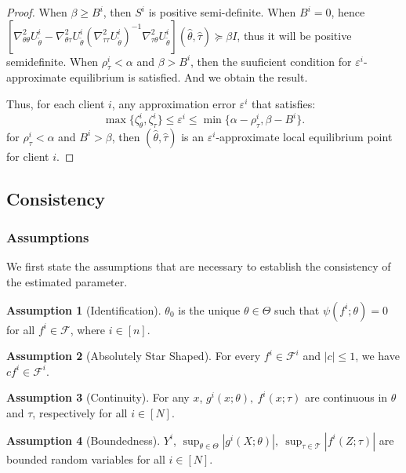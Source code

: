 \documentclass{article}
\def\gF{{\mathcal{F}}}
\def\gT{{\mathcal{T}}}
\theoremstyle{definition}
\newtheorem{assumption}{Assumption}%
\begin{document}
\begin{proof}
When $\beta\geq B^i$, then  $S^i$ is positive semi-definite. 
When $B^i=0$, hence $\left[\nabla_{\theta\theta}^2U_{\tilde\theta}^i-\nabla_{\theta\tau}^2U_{\tilde\theta}^i\left(\nabla_{\tau\tau}^2U_{\tilde\theta}^i\right)^{-1}\nabla_{\tau\theta}^2U_{\tilde\theta}^i\right](\hat\theta,\hat\tau)\succeq \beta I$, thus it will be positive semidefinite. When $\rho_{\tau}^i<\alpha $ and $\beta>B^i$, then the suuficient condition for $\varepsilon^i$-approximate equilibrium is satisfied. And we obtain the result.


Thus, for each client $i$, any approximation error $\varepsilon^i$ that satisfies:
\begin{equation*}
 \max\{ \zeta_{\theta}^i, \zeta_{\tau}^i\}\le \varepsilon^i\le \min\{\alpha-\rho_{\tau}^i,\beta- B^i \}.  
\end{equation*}
for $\rho_{\tau}^i<\alpha$ and $B^i>\beta$, then $(\hat\theta,\hat\tau)$ is an $\varepsilon^i$-approximate local equilibrium point for client $i$.
\end{proof}

\subsection{Consistency}
\label{ap:consistency}
\subsubsection{Assumptions}
We first state the assumptions that are necessary to establish the consistency of the estimated parameter.

\begin{assumption}[Identification]
\label{asm:identification_consistency}
    $\theta_0$ is the unique $\theta\in\Theta$ such that $\psi(f^i;\theta)=0$ for all $f^i\in \gF$, where $i\in[n]$.
\end{assumption}

\begin{assumption}[Absolutely Star Shaped]
\label{asm:starshaped_consistency}
   For every $f^i\in\gF^i$ and $|c|\leq 1$, we have $cf^i\in \gF^i$.
\end{assumption}

\begin{assumption}[Continuity]
\label{asm:continuity_consistency}
    For any $x$, $g^i(x;\theta),~f^i(x;\tau)$ are continuous in $\theta$ and $\tau$, respectively for all $i\in[N]$.
\end{assumption}

\begin{assumption}[Boundedness]
\label{asm:boundedness_consistency}
    $Y^i$, $\sup_{\theta\in\Theta}|g^i(X;\theta)|,~\sup_{\tau\in\gT}|f^i(Z;\tau)|$ are bounded random variables for all $i\in[N]$.
\end{assumption}
\end{document}
